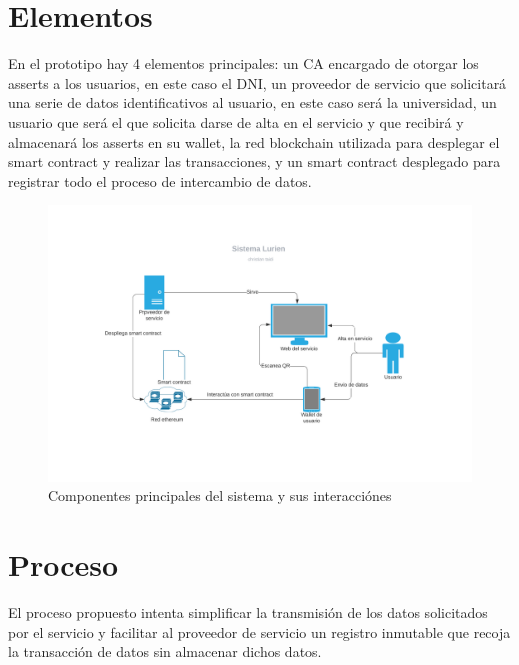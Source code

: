 \documentclass[12pt]{report}
\begin{document}
\section{Elementos}
En el prototipo hay 4 elementos principales: un CA encargado de otorgar los asserts a los usuarios, en este caso el DNI, un proveedor de servicio que solicitará una serie de datos identificativos al usuario, en este caso será la universidad, un usuario que será el que solicita darse de alta en el servicio y que recibirá y almacenará los asserts en su wallet, la red blockchain utilizada para desplegar el smart contract y realizar las transacciones, y un smart contract desplegado para registrar todo el proceso de intercambio de datos.
\begin{figure}
\includegraphics[width=1\textwidth]{componentes}
\caption{Componentes principales del sistema y sus interacciónes}
\end{figure}
\section{Proceso}
El proceso propuesto intenta simplificar la transmisión de los datos solicitados por el servicio y facilitar al proveedor de servicio un registro inmutable que recoja la transacción de datos sin almacenar dichos datos.
\end{document}
